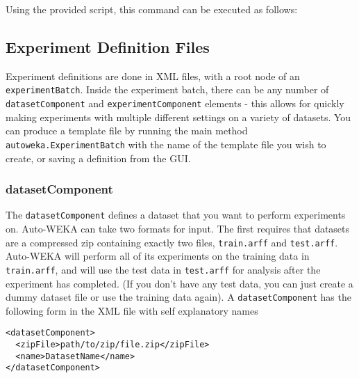 \begin{aside}
  Using the provided script, this command can be executed as follows: \\
\end{aside}

\subsection{Experiment Definition Files}\label{sec:experimentdefs}

Experiment definitions are done in XML files, with a root node of an \texttt{experimentBatch}. Inside the experiment batch, there can be any number of \texttt{datasetComponent} and \texttt{experimentComponent} elements - this allows for quickly making experiments with multiple different settings on a variety of datasets. You can produce a template file by running the main method \texttt{autoweka.ExperimentBatch} with the name of the template file you wish to create, or saving a definition from the GUI.

\subsubsection{datasetComponent}

The \texttt{datasetComponent} defines a dataset that you want to perform experiments on. Auto-WEKA can take two formats for input. The first requires that datasets are a compressed zip containing exactly two files, \texttt{train.arff} and \texttt{test.arff}. Auto-WEKA will perform all of its experiments on the training data in \texttt{train.arff}, and will use the test data in \texttt{test.arff} for analysis after the experiment has completed. (If you don't have any test data, you can just create a dummy dataset file or use the training data again). A \texttt{datasetComponent} has the following form in the XML file with self explanatory names

\begin{verbatim}
<datasetComponent>
  <zipFile>path/to/zip/file.zip</zipFile>
  <name>DatasetName</name>
</datasetComponent>
\end{verbatim}

